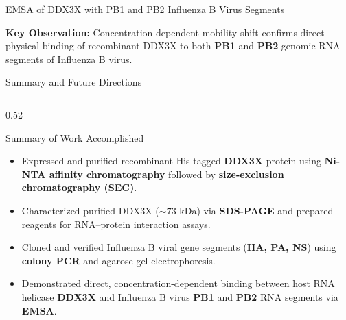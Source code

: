 \documentclass[aspectratio=169, 10pt]{beamer}
\begin{document}
\begin{frame}{EMSA of DDX3X with PB1 and PB2 Influenza B Virus Segments}
  \vspace{0.15cm}
  \begin{center}
    \begin{block}{}
      \centering\footnotesize\textbf{Key Observation:} Concentration-dependent mobility shift confirms direct physical binding of recombinant DDX3X to both \textbf{PB1} and \textbf{PB2} genomic RNA segments of Influenza B virus.
    \end{block}
  \end{center}
\end{frame}

\begin{frame}{Summary and Future Directions}
  \begin{columns}[T]
    \begin{column}{0.52\textwidth}
      \begin{block}{Summary of Work Accomplished}
        \begin{itemize}
          \setlength\itemsep{0.5em}
          \item Expressed and purified recombinant His-tagged \textbf{DDX3X} protein using \textbf{Ni-NTA affinity chromatography} followed by \textbf{size-exclusion chromatography (SEC)}.
          \item Characterized purified DDX3X ($\sim 73\text{ kDa}$) via \textbf{SDS-PAGE} and prepared reagents for RNA--protein interaction assays.
          \item Cloned and verified Influenza B viral gene segments (\textbf{HA, PA, NS}) using \textbf{colony PCR} and agarose gel electrophoresis.
          \item Demonstrated direct, concentration-dependent binding between host RNA helicase \textbf{DDX3X} and Influenza B virus \textbf{PB1} and \textbf{PB2} RNA segments via \textbf{EMSA}.
        \end{itemize}
      \end{block}
    \end{column}


\end{columns}
\end{frame}
\end{document}
